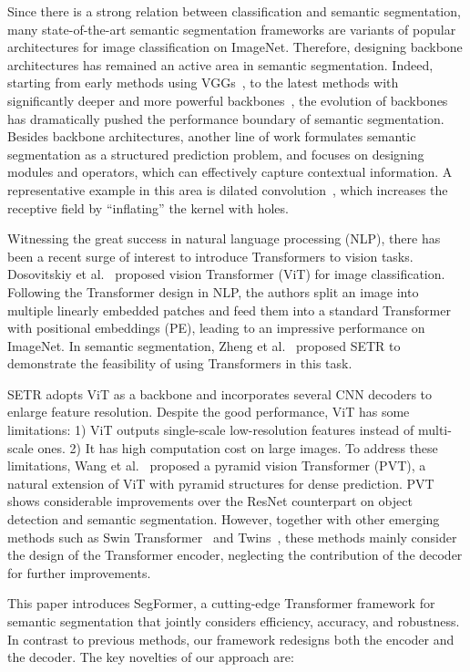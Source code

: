 Since there is a strong relation between classification and semantic segmentation, many state-of-the-art semantic segmentation frameworks are variants of popular architectures for image classification on ImageNet. Therefore, designing backbone architectures has remained an active area in semantic segmentation. Indeed, starting from early methods using VGGs~\cite{fcn,deeplab}, to the latest methods with significantly deeper and more powerful backbones~\cite{zhang2020resnest}, the evolution of backbones has dramatically pushed the performance boundary of semantic segmentation. Besides backbone architectures, another line of work formulates semantic segmentation as a structured prediction problem, and focuses on designing modules and operators, which can effectively capture contextual information. A representative example in this area is dilated convolution~\cite{deeplabv2,dilate}, which increases the receptive field by ``inflating'' the kernel with holes.

Witnessing the great success in natural language processing (NLP), there has been a recent surge of interest to introduce Transformers to vision tasks. Dosovitskiy et al.~\cite{vit} proposed vision Transformer (ViT) for image classification. Following the Transformer design in NLP, the authors split an image into multiple linearly embedded patches and feed them into a standard Transformer with positional embeddings (PE), leading to an impressive performance on ImageNet. In semantic segmentation, Zheng et al.~\cite{setr} proposed SETR to demonstrate the feasibility of using Transformers in this task. 

SETR adopts ViT as a backbone and incorporates several CNN decoders to enlarge feature resolution. Despite the good performance, ViT has some limitations: 1) ViT outputs single-scale low-resolution features instead of multi-scale ones. 2) It has high computation cost on large images. To address these limitations, Wang et al.~\cite{pvt} proposed a pyramid vision Transformer (PVT), a natural extension of ViT with pyramid structures for dense prediction. PVT shows considerable improvements over the ResNet counterpart on object detection and semantic segmentation. However, together with other emerging methods such as Swin Transformer~\cite{liu2021swin} and Twins~\cite{chu2021twins}, these methods mainly consider the design of the Transformer encoder, neglecting the contribution of the decoder for further improvements.

This paper introduces SegFormer, a cutting-edge Transformer framework for semantic segmentation that jointly considers efficiency, accuracy, and robustness. In contrast to previous methods, our framework redesigns both the encoder and the decoder. The key novelties of our approach are:

